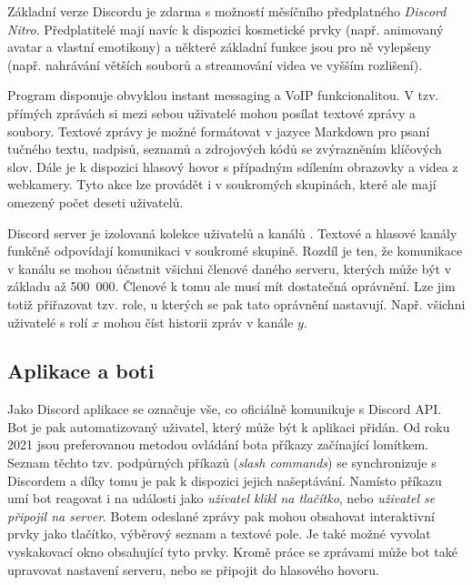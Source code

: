 \documentclass[FM]{tulthesis}
\begin{document}
	Základní verze Discordu je zdarma s možností měsíčního předplatného \textit{Discord Nitro}. Předplatitelé mají navíc k dispozici kosmetické prvky (např. animovaný avatar a vlastní emotikony) a některé základní funkce jsou pro ně vylepšeny (např. nahrávání větších souborů a streamování videa ve vyšším rozlišení).	

	Program disponuje obvyklou instant messaging a VoIP funkcionalitou. V tzv. přímých zprávách si mezi sebou uživatelé mohou posílat textové zprávy a soubory. Textové zprávy je možné formátovat v jazyce Markdown pro psaní tučného textu, nadpisů, seznamů a zdrojových kódů se zvýrazněním klíčových slov. Dále je k dispozici hlasový hovor s případným sdílením obrazovky a videa z webkamery. Tyto akce lze provádět i v soukromých skupinách, které ale mají omezený počet deseti uživatelů.
	
	Discord server je izolovaná kolekce uživatelů a kanálů \cite{doc_Discord}. Textové a hlasové kanály funkčně odpovídají komunikaci v soukromé skupině. Rozdíl je ten, že komunikace v kanálu se mohou účastnit všichni členové daného serveru, kterých může být v základu až 500~000. Členové k tomu ale musí mít dostatečná oprávnění. Lze jim totiž přiřazovat tzv. role, u kterých se pak tato oprávnění nastavují. Např. všichni uživatelé s rolí $x$ mohou číst historii zpráv v kanále $y$.
	
	\subsection{Aplikace a boti}
	
	Jako Discord aplikace se označuje vše, co oficiálně komunikuje s Discord API. Bot je pak automatizovaný uživatel, který může být k aplikaci přidán. Od roku 2021 jsou preferovanou metodou ovládání bota příkazy začínající lomítkem. Seznam těchto tzv. podpůrných příkazů (\textit{slash commands}) se synchronizuje s Discordem a díky tomu je pak k dispozici jejich našeptávání. Namísto příkazu umí bot reagovat i na události jako \textit{uživatel klikl na tlačítko}, nebo \textit{uživatel se připojil na server}. Botem odeslané zprávy pak mohou obsahovat interaktivní prvky jako tlačítko, výběrový seznam a textové pole. Je také možné vyvolat vyskakovací okno obsahující tyto prvky. Kromě práce se zprávami může bot také upravovat nastavení serveru, nebo se připojit do hlasového hovoru. \cite{pdf_apps101}
	
\end{document}
